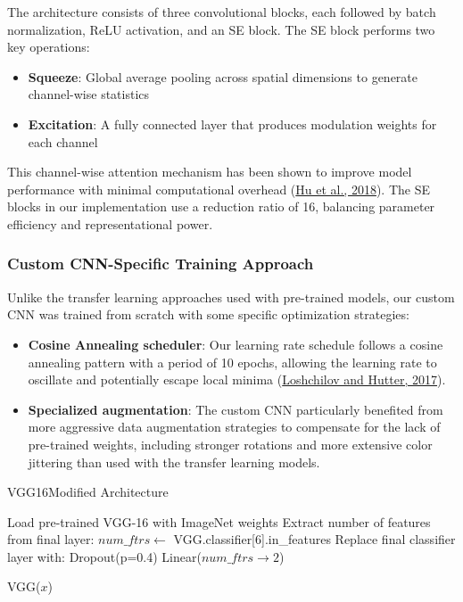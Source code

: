 \documentclass[a4paper,12pt]{article}
\begin{document}
The architecture consists of three convolutional blocks, each followed by batch normalization, ReLU activation, and an SE block. The SE block performs two key operations:
\begin{itemize}
    \item \textbf{Squeeze}: Global average pooling across spatial dimensions to generate channel-wise statistics
    \item \textbf{Excitation}: A fully connected layer that produces modulation weights for each channel
\end{itemize}

This channel-wise attention mechanism has been shown to improve model performance with minimal computational overhead (\href{https://openaccess.thecvf.com/content_cvpr_2018/papers/Hu_Squeeze-and-Excitation_Networks_CVPR_2018_paper.pdf}{Hu et al., 2018}). The SE blocks in our implementation use a reduction ratio of 16, balancing parameter efficiency and representational power.

\subsubsection{Custom CNN-Specific Training Approach}

Unlike the transfer learning approaches used with pre-trained models, our custom CNN was trained from scratch with some specific optimization strategies:

\begin{itemize}
    \item \textbf{Cosine Annealing scheduler}: Our learning rate schedule follows a cosine annealing pattern with a period of 10 epochs, allowing the learning rate to oscillate and potentially escape local minima (\href{https://arxiv.org/abs/1608.03983}{Loshchilov and Hutter, 2017}).
    
    \item \textbf{Specialized augmentation}: The custom CNN particularly benefited from more aggressive data augmentation strategies to compensate for the lack of pre-trained weights, including stronger rotations and more extensive color jittering than used with the transfer learning models.
\end{itemize}


\begin{algorithm}
    \caption{VGG16Modified Architecture}
    \begin{algorithmic}[1]
        \State Load pre-trained VGG-16 with ImageNet weights
        \State Extract number of features from final layer: $num\_ftrs \gets$ VGG.classifier[6].in\_features
        \State Replace final classifier layer with:
        \Indent
            \State Dropout(p=0.4)
            \State Linear($num\_ftrs \to 2$) 
        \EndIndent
    \EndFunction
    
        \State \Return VGG($x$)
    \EndFunction
    \end{algorithmic}
    \end{algorithm}
\end{document}
